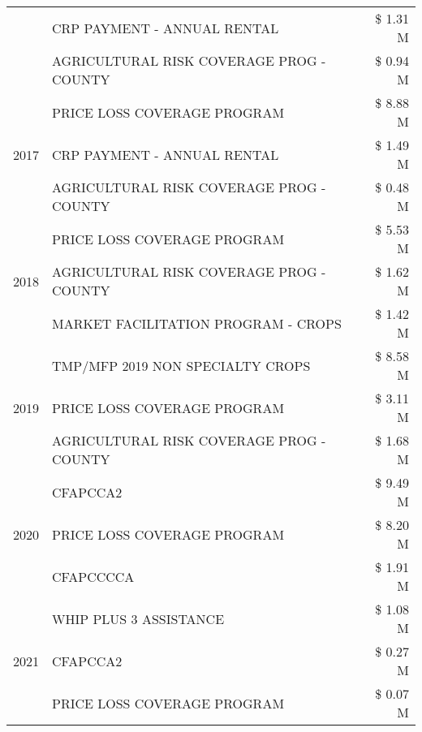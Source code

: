 \begin{tabular}{llr}
 & CRP PAYMENT - ANNUAL RENTAL & \$ 1.31 M \\
 & AGRICULTURAL RISK COVERAGE PROG - COUNTY & \$ 0.94 M \\
\cline{1-3}
\multirow[t]{3}{*}{2017} & PRICE LOSS COVERAGE PROGRAM & \$ 8.88 M \\
 & CRP PAYMENT - ANNUAL RENTAL & \$ 1.49 M \\
 & AGRICULTURAL RISK COVERAGE PROG - COUNTY & \$ 0.48 M \\
\cline{1-3}
\multirow[t]{3}{*}{2018} & PRICE LOSS COVERAGE PROGRAM & \$ 5.53 M \\
 & AGRICULTURAL RISK COVERAGE PROG - COUNTY & \$ 1.62 M \\
 & MARKET FACILITATION PROGRAM - CROPS & \$ 1.42 M \\
\cline{1-3}
\multirow[t]{3}{*}{2019} & TMP/MFP 2019 NON SPECIALTY CROPS & \$ 8.58 M \\
 & PRICE LOSS COVERAGE PROGRAM & \$ 3.11 M \\
 & AGRICULTURAL RISK COVERAGE PROG - COUNTY & \$ 1.68 M \\
\cline{1-3}
\multirow[t]{3}{*}{2020} & CFAPCCA2 & \$ 9.49 M \\
 & PRICE LOSS COVERAGE PROGRAM & \$ 8.20 M \\
 & CFAPCCCCA & \$ 1.91 M \\
\cline{1-3}
\multirow[t]{3}{*}{2021} & WHIP PLUS 3 ASSISTANCE & \$ 1.08 M \\
 & CFAPCCA2 & \$ 0.27 M \\
 & PRICE LOSS COVERAGE PROGRAM & \$ 0.07 M \\
\cline{1-3}
\bottomrule
\end{tabular}
